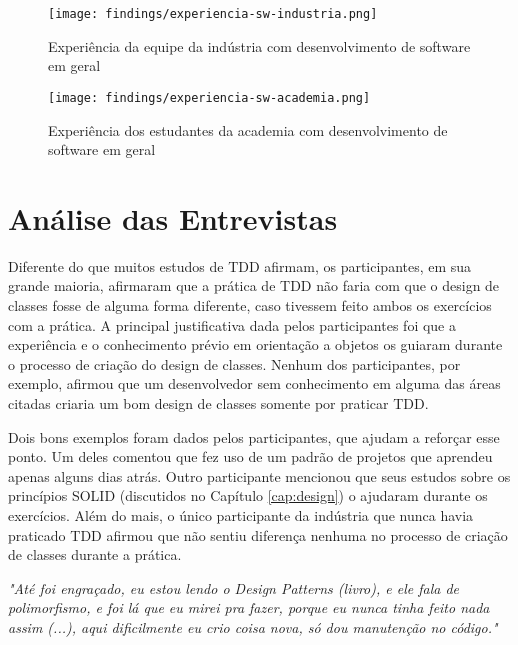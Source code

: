 \begin{figure}[ht]
  \begin{minipage}[b]{0.45\linewidth}
    \centering
    \texttt{[image: findings/experiencia-sw-industria.png]}
    \caption{Experiência da equipe da indústria com desenvolvimento de software em geral}
    \label{fig:exp-sw-industria}
  \end{minipage}
  \hspace{0.5cm}
  \begin{minipage}[b]{0.45\linewidth}
    \centering
    \texttt{[image: findings/experiencia-sw-academia.png]}
    \caption{Experiência dos estudantes da academia com desenvolvimento de software em geral}  
    \label{fig:exp-sw-academia}
  \end{minipage}
\end{figure}


\section{Análise das Entrevistas}

Diferente do que muitos estudos de TDD afirmam, os participantes, em sua grande maioria, afirmaram que 
a prática de TDD não faria com que o design de classes fosse de alguma forma diferente, caso tivessem
feito ambos os exercícios com a prática.
A principal justificativa dada pelos participantes foi que a experiência e o conhecimento prévio
em orientação a objetos os guiaram durante o processo de criação do design de classes. Nenhum dos
participantes, por exemplo, afirmou que um desenvolvedor sem conhecimento em alguma das áreas
citadas criaria um bom design de classes somente por praticar TDD.

Dois bons exemplos foram dados pelos participantes, que ajudam a reforçar esse ponto. Um deles
comentou que fez uso de um padrão de projetos \cite{gof} que aprendeu apenas alguns dias atrás.
Outro participante mencionou que seus estudos sobre os princípios SOLID (discutidos no Capítulo \ref{cap:design})
o ajudaram durante os exercícios. Além do mais, o único participante da indústria que nunca havia
praticado TDD afirmou que não sentiu diferença nenhuma no processo de criação de classes durante
a prática. 

\textit{"Até foi engraçado, eu estou lendo o Design Patterns (livro), e ele fala de polimorfismo, e foi
lá que eu mirei pra fazer, porque eu nunca tinha feito nada assim (...), aqui dificilmente eu crio
coisa nova, só dou manutenção no código."}


